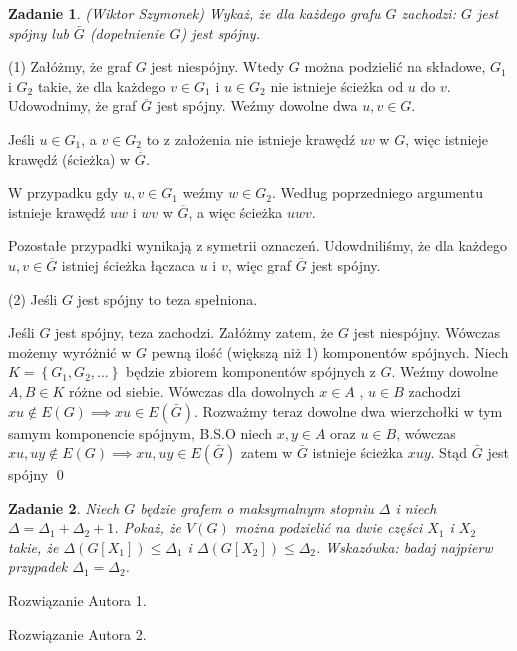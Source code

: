 \documentclass{mwart}
\newtheorem{zad}{Zadanie}[section]
\begin{document}
\begin{zad} (Wiktor Szymonek)
    Wykaż, że dla każdego grafu $G$ zachodzi: $G$ jest spójny lub $\bar{G}$ (dopełnienie $G$) jest spójny.
\end{zad}
\begin{mdframed}

     (1) Załóżmy, że graf $G$ jest niespójny. Wtedy $G$ można podzielić na 
     składowe, $G_1$ i $G_2$ takie, że dla każdego $v \in G_1$ i $u \in G_2$ 
     nie istnieje ścieżka od $u$ do $v$. Udowodnimy, że graf $\overline{G}$ jest 
     spójny. Weźmy dowolne dwa $u, v \in G$. 
     
         Jeśli $u \in G_1$, a $v \in G_2$ to 
     z założenia nie istnieje krawędź $uv$ w $G$, więc istnieje krawędź (ścieżka) w 
     $\overline{G}$. 
     
         W przypadku gdy $u, v \in G_1$ weźmy $w \in G_2$. Według poprzedniego 
     argumentu istnieje krawędź $uw$ i $wv$ w $\overline{G}$, a więc ścieżka $uwv$. 
     
         Pozostałe przypadki wynikają z symetrii oznaczeń. Udowdniliśmy, że dla każdego 
     $u, v \in \overline{G}$ istniej ścieżka łączaca $u$ i $v$, więc graf $\overline{G}$ 
     jest spójny.
 
     (2) Jeśli $G$ jest spójny to teza spełniona.
\end{mdframed}
\begin{mdframed}
    Jeśli $G$ jest spójny, teza zachodzi. Załóżmy zatem, że $G$ jest niespójny. Wówczas możemy wyróżnić w $G$ pewną ilość (większą niż 1) komponentów spójnych.
    Niech \(K = \left\{G_{1},G_{2},\dots\right\}\) będzie zbiorem komponentów spójnych z $G$. Weźmy dowolne \(A,B \in K\) różne od siebie. Wówczas dla dowolnych \(x \in A\) , \(u \in B\) zachodzi 
    \(xu \notin E(G) \implies xu \in E(\bar{G})\). Rozważmy teraz dowolne dwa wierzchołki w tym samym komponencie spójnym, B.S.O niech \(x,y \in A\) oraz \(u \in B\), wówczas \(xu,uy \notin E(G) \implies xu,uy \in E(\bar{G})\) zatem w $\bar{G}$ istnieje ścieżka $xuy$.
    Stąd $\bar{G}$ jest spójny
    \qed
\end{mdframed}


\begin{zad}
    Niech $G$ będzie grafem o maksymalnym stopniu $\Delta$ i niech $\Delta = \Delta_1 + \Delta_2 +1$.
    Pokaż, że $V(G)$ można podzielić na dwie części $X_1$ i $X_2$ takie, że $\Delta (G[X_1]) \leq \Delta_1$ i $\Delta (G[X_2]) \leq \Delta_2$.
    Wskazówka: badaj najpierw przypadek $\Delta_1 = \Delta_2$.
\end{zad}
\begin{mdframed}
    Rozwiązanie Autora 1.
\end{mdframed}
\begin{mdframed}
    Rozwiązanie Autora 2.
\end{mdframed}
\end{document}
